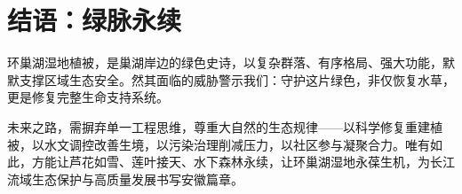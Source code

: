 
\section{结语：绿脉永续}
环巢湖湿地植被，是巢湖岸边的绿色史诗，以复杂群落、有序格局、强大功能，默默支撑区域生态安全。然其面临的威胁警示我们：守护这片绿色，非仅恢复水草，更是修复完整生命支持系统。

未来之路，需摒弃单一工程思维，尊重大自然的生态规律——以科学修复重建植被，以水文调控改善生境，以污染治理削减压力，以社区参与凝聚合力。唯有如此，方能让芦花如雪、莲叶接天、水下森林永续，让环巢湖湿地永葆生机，为长江流域生态保护与高质量发展书写安徽篇章。
